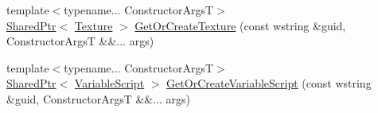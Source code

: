 \begin{DoxyCompactItemize}
\item 
{\footnotesize template$<$typename... Constructor\+ArgsT$>$ }\\\hyperlink{namespacemage_a1e01ae66713838a7a67d30e44c67703e}{Shared\+Ptr}$<$ \hyperlink{classmage_1_1_texture}{Texture} $>$ \hyperlink{classmage_1_1_resource_manager_adc5918799339dbf9be4b49922779ddf7}{Get\+Or\+Create\+Texture} (const wstring \&guid, Constructor\+ArgsT \&\&... args)
\item 
{\footnotesize template$<$typename... Constructor\+ArgsT$>$ }\\\hyperlink{namespacemage_a1e01ae66713838a7a67d30e44c67703e}{Shared\+Ptr}$<$ \hyperlink{classmage_1_1_variable_script}{Variable\+Script} $>$ \hyperlink{classmage_1_1_resource_manager_aa3d2659c473c06423447114dcc0a602c}{Get\+Or\+Create\+Variable\+Script} (const wstring \&guid, Constructor\+ArgsT \&\&... args)
\end{DoxyCompactItemize}
